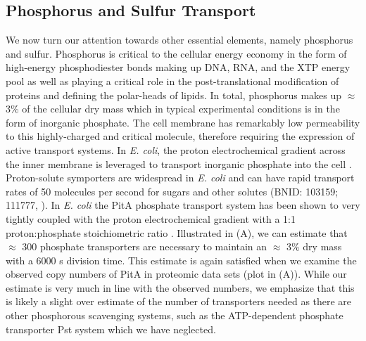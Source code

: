 \subsection{Phosphorus and Sulfur Transport}
We now turn our attention towards other essential elements, namely phosphorus and
sulfur. Phosphorus is critical to the cellular energy economy in the form of
high-energy phosphodiester bonds making up DNA, RNA, and the XTP energy pool as
well as playing a critical role in the post-translational modification of
proteins and defining the polar-heads of lipids. In total, phosphorus
makes up $\approx$3\% of the cellular dry mass which in typical experimental conditions is in the form of inorganic phosphate. The cell membrane
has remarkably low permeability to this highly-charged and critical molecule,
therefore requiring the expression of active transport systems. In \textit{E. coli}, the proton
electrochemical gradient across the inner membrane is leveraged to transport
inorganic phosphate into the cell \cite{rosenberg1977}.
Proton-solute symporters are widespread in \textit{E. coli} \cite{ramos1977,
booth1979} and can have rapid transport rates of 50 molecules per second for
sugars and other solutes (BNID: 103159; 111777, \cite{milo2010}). In \textit{E.
coli} the PitA phosphate transport system has been shown to very tightly coupled
with the proton electrochemical gradient with a 1:1 proton:phosphate
stoichiometric ratio \citep{harris2001, feist2007}. Illustrated in
(A), we can estimate that $\approx$ 300
phosphate transporters are necessary to maintain an $\approx$ 3\% dry mass with
a 6000 s division time. This estimate is again satisfied when we examine the
observed copy numbers of PitA in proteomic data sets (plot in
(A)). While our estimate is very much in line with the
observed numbers, we emphasize that this is likely a slight over estimate of the
number of transporters needed as there are other phosphorous scavenging systems,
such as the ATP-dependent phosphate transporter Pst system which we have neglected.


